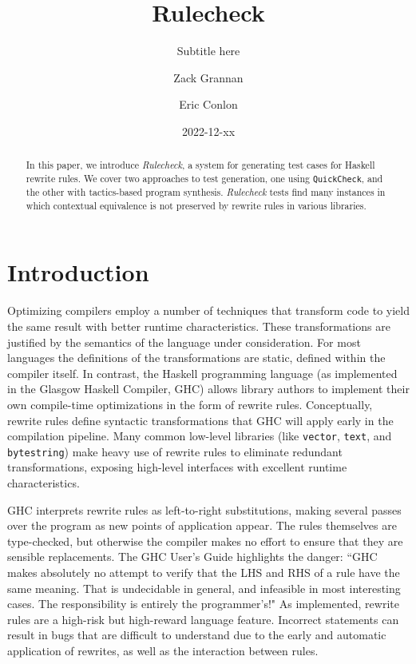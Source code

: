 \documentclass[format=sigconf, nonacm=true, review=true, screen=true]{acmart}
\title{Rulecheck}
\subtitle{Subtitle here}
\author{Zack Grannan}
\author{Eric Conlon}
\date{2022-12-xx}
\newcommand{\Rulecheck}{\textit{Rulecheck}\xspace}
\begin{document}
\begin{abstract}

In this paper, we introduce \Rulecheck, a system for generating test cases for Haskell rewrite rules.  We cover two approaches to test generation, one using \texttt{QuickCheck}, and the other with tactics-based program synthesis. \Rulecheck tests find many instances in which contextual equivalence is not preserved by rewrite rules in various libraries.

\end{abstract}

\maketitle

\section{Introduction}

Optimizing compilers employ a number of techniques that transform code to yield the same result with better runtime characteristics. These transformations are justified by the semantics of the language under consideration. For most languages the definitions of the transformations are static, defined within the compiler itself. In contrast, the Haskell programming language (as implemented in the Glasgow Haskell Compiler, GHC) allows library authors to implement their own compile-time optimizations in the form of rewrite rules. Conceptually, rewrite rules define syntactic transformations that GHC will apply early in the compilation pipeline. Many common low-level libraries (like \texttt{vector}, \texttt{text}, and \texttt{bytestring}) make heavy use of rewrite rules to eliminate redundant transformations, exposing high-level interfaces with excellent runtime characteristics. \cite{coutts2007stream, chakravarty2002approach, chakravarty2007data, shortcutwiki}

GHC interprets rewrite rules as left-to-right substitutions, making several passes over the program as new points of application appear. The rules themselves are type-checked, but otherwise the compiler makes no effort to ensure that they are sensible replacements. The GHC User's Guide highlights the danger: ``GHC makes absolutely no attempt to verify that the LHS and RHS of a rule have the same meaning. That is undecidable in general, and infeasible in most interesting cases. The responsibility is entirely the programmer's!" \cite{userguide} As implemented, rewrite rules are a high-risk but high-reward language feature. Incorrect statements can result in bugs that are difficult to understand due to the early and automatic application of rewrites, as well as the interaction between rules.
\end{document}
